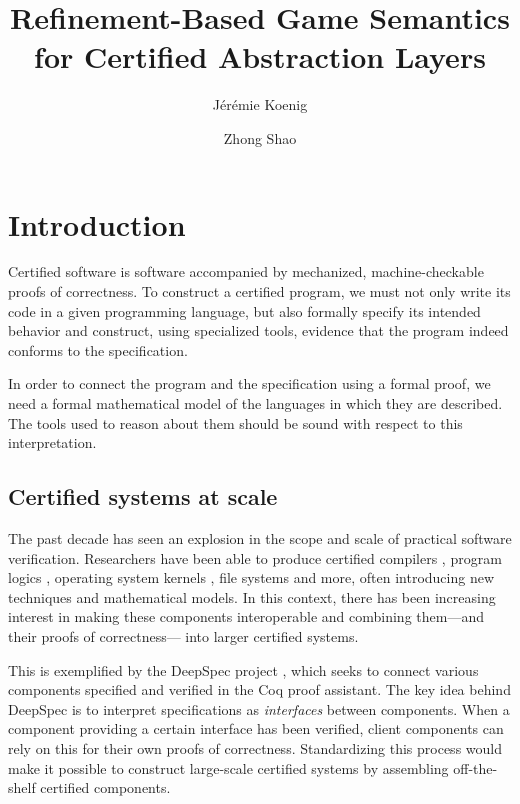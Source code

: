 \documentclass[sigplan,screen]{acmart}
\title{Refinement-Based Game Semantics for Certified Abstraction Layers} %
\author{J\'er\'emie Koenig}
\affiliation{Yale University}
\author{Zhong Shao}
\affiliation{Yale University}
\begin{document}
\maketitle

\section{Introduction} \label{sec:intro} %


Certified software
is software accompanied by
mechanized, machine-checkable proofs of correctness.
To construct a certified program,
we must not only write its code in a given programming language,
but also formally specify its intended behavior
and construct, using specialized tools,
evidence that the program
indeed conforms to the specification.

In order to connect the program and the specification
using a formal proof,
we need a formal mathematical model of
the languages in which they are described.
The tools used to reason about them
should be sound with respect to this interpretation.


\subsection{Certified systems at scale} %

The past decade has seen an explosion
in the scope and scale of practical software verification.
Researchers have been able to produce certified
compilers \cite{compcert},
program logics \cite{vst},
operating system kernels \cite{sel4,popl15},
file systems \cite{fscq} and more,
often introducing new techniques
and mathematical models.
In this context,
there has been increasing interest in
making these components
interoperable and
combining them---and their proofs of correctness---%
into larger certified systems.

This is exemplified by the DeepSpec project \cite{deepspec},
which seeks to connect various components
specified and verified in the Coq proof assistant.
The key idea behind DeepSpec
is to interpret specifications as \emph{interfaces}
between components.
When a component providing a certain interface
has been verified,
client components can rely on this
for their own proofs of correctness.
Standardizing this process would make it possible
to construct large-scale certified systems
by assembling off-the-shelf certified components.
\end{document}
